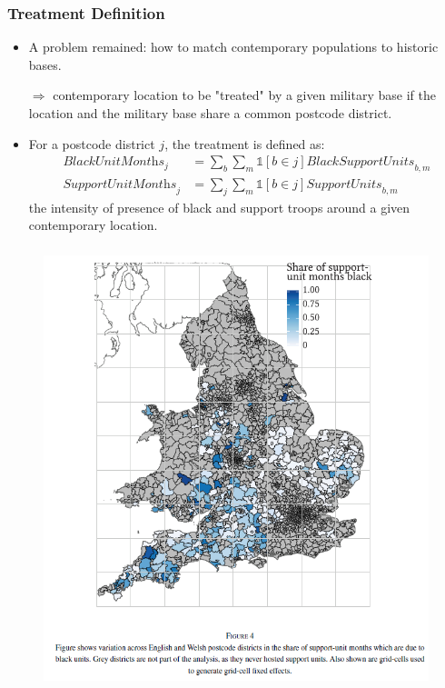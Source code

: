 \documentclass[dvipdfmx,11pt]{beamer}
\begin{document}
\begin{frame}\frametitle{Treatment Definition}
  \begin{itemize}
    \item A problem remained: how to match contemporary populations to historic bases.

    $\Rightarrow$ contemporary location to be "treated" by a given military base if the location and the military base share a common postcode district.
    \item For a postcode district $j$, the treatment is defined as:
    \begin{align*}
      \textit{BlackUnitMonths}_j &= \sum_b \sum_m \mathbb{1}[b \in j] \textit{BlackSupportUnits}_{b, m} \\
      \textit{SupportUnitMonths}_j &= \sum_j \sum_m \mathbb{1}[b \in j] \textit{SupportUnits}_{b, m}
    \end{align*}
    the intensity of presence of black and support troops around a given contemporary location.
  \end{itemize}
\end{frame}

\begin{frame}\frametitle{}
  \begin{figure}
    \centering
    \includegraphics[scale = .6]{os1027tanji/F4}
  \end{figure}
\end{frame}
\end{document}
